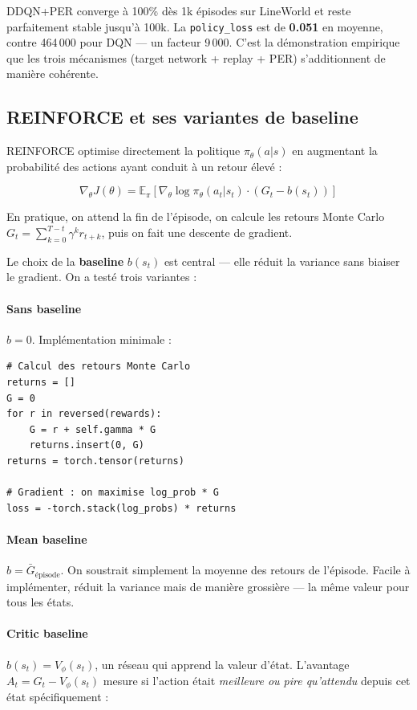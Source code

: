 \documentclass[12pt,a4paper]{article}
\begin{document}
\begin{observationbox}
DDQN+PER converge à 100\% dès 1k épisodes sur LineWorld et reste parfaitement stable jusqu'à 100k. La \texttt{policy\_loss} est de \textbf{0.051} en moyenne, contre 464\,000 pour DQN — un facteur 9\,000. C'est la démonstration empirique que les trois mécanismes (target network + replay + PER) s'additionnent de manière cohérente.
\end{observationbox}

\subsection{REINFORCE et ses variantes de baseline}

REINFORCE optimise directement la politique $\pi_\theta(a|s)$ en augmentant la probabilité des actions ayant conduit à un retour élevé :

\[
\nabla_\theta J(\theta) = \mathbb{E}_\pi\!\left[\nabla_\theta \log \pi_\theta(a_t|s_t) \cdot (G_t - b(s_t))\right]
\]

En pratique, on attend la fin de l'épisode, on calcule les retours Monte Carlo $G_t = \sum_{k=0}^{T-t} \gamma^k r_{t+k}$, puis on fait une descente de gradient.

Le choix de la \textbf{baseline} $b(s_t)$ est central — elle réduit la variance sans biaiser le gradient. On a testé trois variantes :

\paragraph{Sans baseline} $b = 0$. Implémentation minimale :

\begin{lstlisting}
# Calcul des retours Monte Carlo
returns = []
G = 0
for r in reversed(rewards):
    G = r + self.gamma * G
    returns.insert(0, G)
returns = torch.tensor(returns)

# Gradient : on maximise log_prob * G
loss = -torch.stack(log_probs) * returns
\end{lstlisting}

\paragraph{Mean baseline} $b = \bar{G}_{\text{épisode}}$. On soustrait simplement la moyenne des retours de l'épisode. Facile à implémenter, réduit la variance mais de manière grossière — la même valeur pour tous les états.

\paragraph{Critic baseline} $b(s_t) = V_\phi(s_t)$, un réseau qui apprend la valeur d'état. L'avantage $A_t = G_t - V_\phi(s_t)$ mesure si l'action était \emph{meilleure ou pire qu'attendu} depuis cet état spécifiquement :
\end{document}
